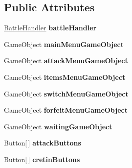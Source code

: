 \subsection*{Public Attributes}
\begin{DoxyCompactItemize}
\item 
\hypertarget{group__client_ga1b3ecd57ac7d9161ea56b8942003a2b5}{\hyperlink{class_battle_handler}{Battle\-Handler} {\bfseries battle\-Handler}}\label{group__client_ga1b3ecd57ac7d9161ea56b8942003a2b5}

\item 
\hypertarget{group__client_gab272bc3fa2feae7a46ee866a5252d47b}{Game\-Object {\bfseries main\-Menu\-Game\-Object}}\label{group__client_gab272bc3fa2feae7a46ee866a5252d47b}

\item 
\hypertarget{group__client_ga0c493074ee8edeaaeafd6be0792f1b8e}{Game\-Object {\bfseries attack\-Menu\-Game\-Object}}\label{group__client_ga0c493074ee8edeaaeafd6be0792f1b8e}

\item 
\hypertarget{group__client_gaf99e8408c55ed31be12051692750cb97}{Game\-Object {\bfseries items\-Menu\-Game\-Object}}\label{group__client_gaf99e8408c55ed31be12051692750cb97}

\item 
\hypertarget{group__client_ga980ceadc6a8df5e2993b6fc97dc89083}{Game\-Object {\bfseries switch\-Menu\-Game\-Object}}\label{group__client_ga980ceadc6a8df5e2993b6fc97dc89083}

\item 
\hypertarget{group__client_gaf29f6bee62095208f55a9d3fee5a628c}{Game\-Object {\bfseries forfeit\-Menu\-Game\-Object}}\label{group__client_gaf29f6bee62095208f55a9d3fee5a628c}

\item 
\hypertarget{group__client_gad6f40ffcec5911934218836218995e41}{Game\-Object {\bfseries waiting\-Game\-Object}}\label{group__client_gad6f40ffcec5911934218836218995e41}

\item 
\hypertarget{group__client_ga57dc6e1b53d2412dd00eb29859bac337}{Button\mbox{[}$\,$\mbox{]} {\bfseries attack\-Buttons}}\label{group__client_ga57dc6e1b53d2412dd00eb29859bac337}

\item 
\hypertarget{group__client_ga188d6c1d20ceab7503469b77818cb7fc}{Button\mbox{[}$\,$\mbox{]} {\bfseries cretin\-Buttons}}\label{group__client_ga188d6c1d20ceab7503469b77818cb7fc}


\end{DoxyCompactItemize}
